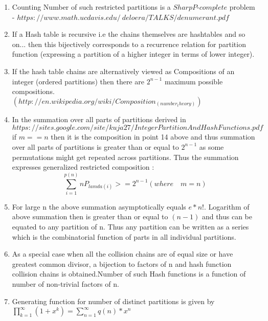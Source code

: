 \documentclass[11pt,onecolumn]{article}
\begin{document}
\begin{enumerate}
\item Counting Number of such restricted partitions is a $SharpP$-$complete$ problem - $https://www.math.ucdavis.edu/~deloera/TALKS/denumerant.pdf$

\item If a Hash table is recursive i.e the chains themselves are hashtables and so on... then this bijectively corresponds to a recurrence relation for partition function (expressing a partition of a higher integer in terms of lower integer).

\item If the hash table chains are alternatively viewed as 
Compositions of an integer (ordered partitions) then 
there are $2^{n-1}$ maximum possible compositions.\\
$(http://en.wikipedia.org/wiki/Composition_(number_theory))$

\item In the summation over all parts of partitions derived in \\
 $https://sites.google.com/site/kuja27/IntegerPartitionAndHashFunctions.pdf$ \\
if $m==n$ then it is the composition in point 14 above and thus summation 
over all parts of partitions is greater than or equal to $2^{n-1}$ as some 
permutations might get repeated across partitions. Thus the summation expresses 
generalized restricted composition :
\begin{equation}
\sum_{i=1}^{p(n)} nP_{lamda(i)} >= 2^{n-1} (where \quad m=n)
\end{equation}

\item For large n the above summation asymptotically equals $e*n!$. Logarithm of above summation then is greater than or equal to $(n-1)$ and thus can be equated to any partition of n. Thus any partition can be written as a series which is the combinatorial function of parts in all individual partitions.

\item As a special case when all the collision chains are of equal size or have greatest common divisor, a bijection to factors of n and hash function collision chains is obtained.Number of such Hash functions is a function of number of non-trivial factors of n.

\item Generating function for number of distinct partitions is given by $\prod_{k=1}^{\infty} (1+x^{k}) = \sum_{n=1}^{\infty} q(n)*x^{n}$


\end{enumerate}
\end{document}
